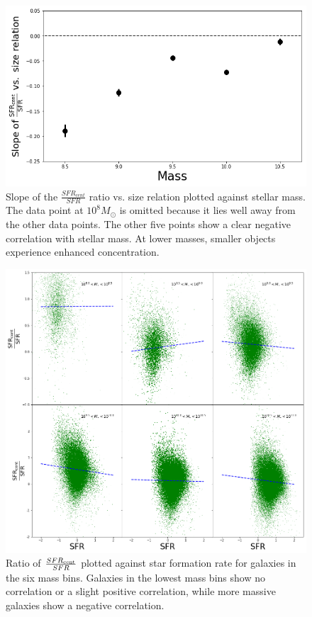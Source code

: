\documentclass[iop]{emulateapj}
\begin{document}
\begin{figure}
	\centering
	\includegraphics[width= \columnwidth]{slope_cent_excess.png}
	\caption{Slope of the $\frac{SFR_{cent}}{SFR}$ ratio vs. size relation plotted against stellar mass. The data point at $10^{8} M_{\odot}$ is omitted because it lies well away from the other data points. The other five points show a clear negative correlation with stellar mass. At lower masses, smaller objects experience enhanced concentration.}
	\label{fig:HA_ex_mass}
	
\end{figure}

\begin{figure}
	\centering
	\includegraphics[width=1.5 \columnwidth]{cent_sfr_bins.png}
	\caption{Ratio of $\frac{SFR_{\rm cent}}{SFR}$ plotted against star formation rate for galaxies in the six mass bins. Galaxies in the lowest mass bins show no correlation or a slight positive correlation, while more massive galaxies show a negative correlation.}
	\label{fig:dens_bin}
	
\end{figure}
\end{document}
